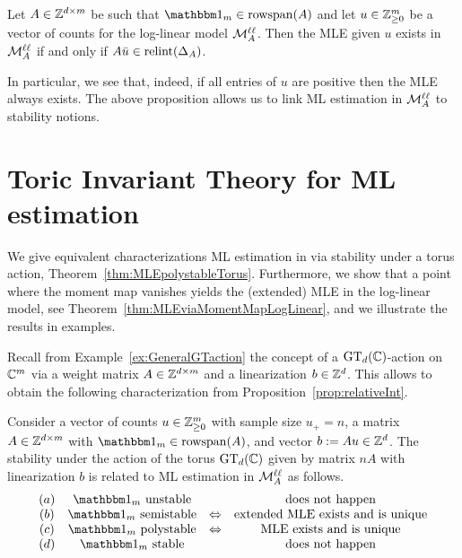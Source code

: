 \begin{prop}
	\label{prop:relativeInt}
	Let $A \in \mathbb Z^{d \times m}$ be such that $\ones_m \in \rsp(A)$ and let $u \in \mathbb Z^m_{\geq 0}$ be a vector of counts for the log-linear model $\mathcal{M}^{\mathtt{\ell \ell}}_A$. Then the MLE given $u$ exists in $\mathcal{M}^{\mathtt{\ell \ell}}_A$ if and only if $A \bar{u} \in \operatorname{relint}(\Delta_A)$.
\end{prop}

In particular, we see that, indeed, if all entries of $u$ are positive then the MLE always exists. The above proposition allows us to link ML estimation in $\mathcal{M}^{\mathtt{\ell \ell}}_A$ to stability notions.



\section{Toric Invariant Theory for ML estimation}\label{sec:ToricInvTheoryLogLinear}


We give equivalent characterizations ML estimation in via stability under a torus action, Theorem~\ref{thm:MLEpolystableTorus}. Furthermore, we show that a point where the moment map vanishes yields the (extended) MLE in the log-linear model, see Theorem~\ref{thm:MLEviaMomentMapLogLinear}, and we illustrate the results in examples.

\medskip

Recall from Example~\ref{ex:GeneralGTaction} the concept of a $\operatorname{GT}_d(\mathbb C)$-action on $\mathbb C^m$ via a weight matrix $A \in \mathbb Z^{d \times m}$ and a linearization $b \in \mathbb Z^d$. This allows to obtain the following characterization from Proposition~\ref{prop:relativeInt}.

\begin{theorem}
	\label{thm:MLEpolystableTorus}
	Consider a vector of counts $u \in \mathbb Z^{m}_{\geq 0}$ with sample size $u_+ = n$, a matrix $A \in \mathbb Z^{d \times m}$ with $\ones_m \in \rsp(A)$, and vector $b := Au \in \mathbb Z^d$. 
	The stability under the action of the torus $\operatorname{GT}_d(\mathbb C)$ given by matrix $n A$  with linearization $b$ is related to ML estimation in $\mathcal{M}^{\mathtt{\ell \ell}}_A$ as follows.
	\[\begin{matrix}
		(a) & \ones_m \text{ unstable} &  & \text{does not happen} \\
		(b) & \ones_m \text{ semistable} & \Leftrightarrow & \text{extended MLE exists and is unique} \\
		(c) & \ones_m \text{ polystable} &  \Leftrightarrow & \text{MLE exists and is unique} \\
		(d) & \ones_m \text{ stable} &  & \text{does not happen}
	\end{matrix}
	\]
\end{theorem}

